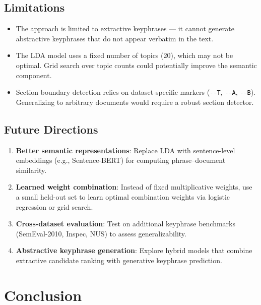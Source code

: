 \documentclass[pdflatex,sn-mathphys-num]{sn-jnl}
\begin{document}
\subsection{Limitations}

\begin{itemize}
  \item The approach is limited to extractive keyphrases --- it cannot generate abstractive
        keyphrases that do not appear verbatim in the text.
  \item The LDA model uses a fixed number of topics (20), which may not be optimal. Grid search
        over topic counts could potentially improve the semantic component.
  \item Section boundary detection relies on dataset-specific markers (\texttt{-{}-T}, \texttt{-{}-A},
        \texttt{-{}-B}). Generalizing to arbitrary documents would require a robust section detector.
\end{itemize}

\subsection{Future Directions}

\begin{enumerate}
  \item \textbf{Better semantic representations}: Replace LDA with sentence-level embeddings (e.g.,
        Sentence-BERT) for computing phrase--document similarity.
  \item \textbf{Learned weight combination}: Instead of fixed multiplicative weights, use a small
        held-out set to learn optimal combination weights via logistic regression or grid search.
  \item \textbf{Cross-dataset evaluation}: Test on additional keyphrase benchmarks (SemEval-2010,
        Inspec, NUS) to assess generalizability.
  \item \textbf{Abstractive keyphrase generation}: Explore hybrid models that combine extractive
        candidate ranking with generative keyphrase prediction.
\end{enumerate}

\section{Conclusion}\label{sec:conclusion}
\end{document}
